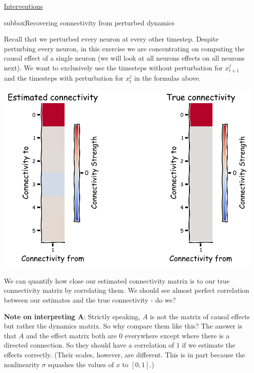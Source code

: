 \begin{textbox}{\href{https://compneuro.neuromatch.io/tutorials/W3D5_NetworkCausality/student/W3D5_Tutorial1.html}{Interventions }   }

\begin{subbox}{subbox}{Recovering connectivity from perturbed dynamics}
\scriptsize

Recall that we perturbed every neuron at every other timestep. Despite perturbing every neuron, in this exercise we are concentrating on computing the causal effect of a single neuron (we will look at all neurons effects on all neurons next). We want to exclusively use the timesteps without perturbation for $x^j_{t+1}$ and the timesteps with perturbation for $x^j_{t}$ in the formulas above.

\begin{center}
    
\includegraphics[scale=0.15]{Figures/NC/NC_Figure4.png}
\end{center}
We can quantify how close our estimated connectivity matrix is to our true connectivity matrix by correlating them. We should see almost perfect correlation between our estimates and the true connectivity - do we?

\textbf{Note on interpreting A}: Strictly speaking, $A$ is not the matrix of causal effects but rather the dynamics matrix. So why compare them like this? The answer is that $A$ and the effect matrix both are $0$ everywhere except where there is a directed connection. So they should have a correlation of $1$ if we estimate the effects correctly. (Their scales, however, are different. This is in part because the nonlinearity $\sigma$ squashes the values of $x$ to $[0,1]$.) 
\begin{center}
    

\end{center}
\end{subbox}
\end{textbox}
